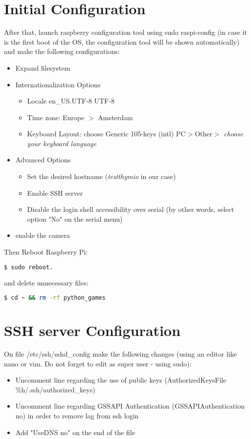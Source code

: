 \documentclass[12pt]{article}%
\begin{document}
\section{Initial Configuration}
	After that, launch raspberry configuration tool using sudo raspi-config (in case it is the first boot of the OS, the configuration tool will be shown automatically) and make the following configurations:
	\begin{itemize}
		\item Expand filesystem
		\item Internationalization Options
			\begin{itemize}
				\item Locale en\_US.UTF-8 UTF-8
				\item Time zone: Europe $>$ Amsterdam
				\item Keyboard Layout: choose Generic 105-keys (intl) PC$>$Other$>$ \textit{choose your keyboard language}
			\end{itemize}
		\item Advanced Options
			\begin{itemize}
				\item Set the desired hostname (\textit{testthymio} in our case)
				\item Enable SSH server
				\item Disable the login shell accessibility over serial (by other words, select option "No" on the serial menu)
			\end{itemize}
		\item enable the camera
	\end{itemize}


	Then Reboot Raspberry Pi:
	\begin{lstlisting}[language=Bash]
$ sudo reboot.
	\end{lstlisting}
	
	and delete unnecessary files:
	\begin{lstlisting}[language=Bash]
$ cd ~ && rm -rf python_games
	\end{lstlisting}


\section{SSH server Configuration}
	On file /etc/ssh/sshd\_config make the following changes (using an editor like nano or vim. Do not forget to edit as super user - using sudo):
	\begin{itemize}
		\item Uncomment line regarding the use of public keys (AuthorizedKeysFile \%h/.ssh/authorized\_keys)
		\item Uncomment line regarding GSSAPI Authentication (GSSAPIAuthentication no) in order to remove lag from ssh login
		\item Add "UseDNS no" on the end of the file
	\end{itemize}
	
\end{document}
